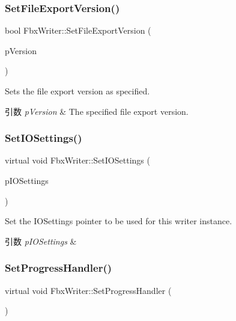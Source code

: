 \subsubsection{\texorpdfstring{Set\+File\+Export\+Version()}{SetFileExportVersion()}}
{\footnotesize\ttfamily bool Fbx\+Writer\+::\+Set\+File\+Export\+Version (\begin{DoxyParamCaption}\item[{\hyperlink{class_fbx_string}{Fbx\+String}}]{p\+Version }\end{DoxyParamCaption})}

Sets the file export version as specified. 
\begin{DoxyParams}{引数}
{\em p\+Version} & The specified file export version. \\
\hline
\end{DoxyParams}
\mbox{\label{class_fbx_writer_acdc632472e0252b6087fd55ef05a7e2a}} 
\subsubsection{\texorpdfstring{Set\+I\+O\+Settings()}{SetIOSettings()}}
{\footnotesize\ttfamily virtual void Fbx\+Writer\+::\+Set\+I\+O\+Settings (\begin{DoxyParamCaption}\item[{\hyperlink{class_fbx_i_o_settings}{Fbx\+I\+O\+Settings} $\ast$}]{p\+I\+O\+Settings }\end{DoxyParamCaption})\hspace{0.3cm}{\ttfamily [virtual]}}

Set the I\+O\+Settings pointer to be used for this writer instance. 
\begin{DoxyParams}{引数}
{\em p\+I\+O\+Settings} & \\
\hline
\end{DoxyParams}
\mbox{\label{class_fbx_writer_a1a3cf241a0c11364981ebd23be59fd8f}} 
\subsubsection{\texorpdfstring{Set\+Progress\+Handler()}{SetProgressHandler()}}
{\footnotesize\ttfamily virtual void Fbx\+Writer\+::\+Set\+Progress\+Handler (\begin{DoxyParamCaption}\item[{\hyperlink{class_fbx_progress}{Fbx\+Progress} $\ast$}]{ }\end{DoxyParamCaption})\hspace{0.3cm}{\ttfamily [virtual]}}

